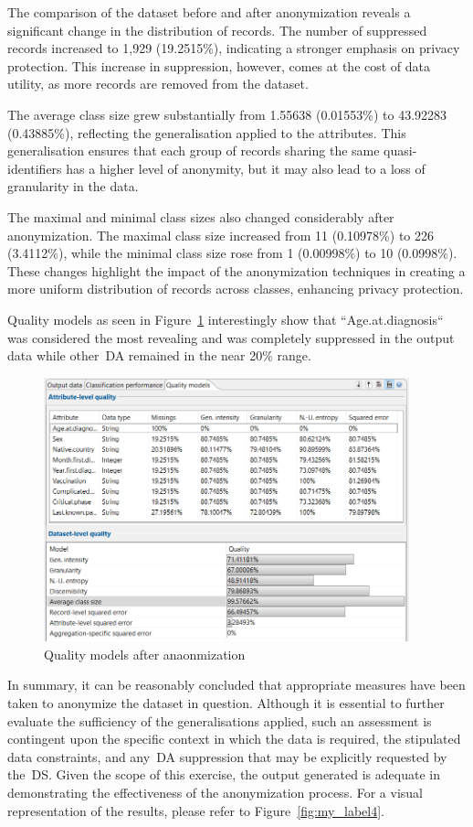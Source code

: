 The comparison of the dataset before and after anonymization reveals a significant change in the distribution of records. The number of suppressed records increased to 1,929 (19.2515\%), indicating a stronger emphasis on privacy protection. This increase in suppression, however, comes at the cost of data utility, as more records are removed from the dataset.

The average class size grew substantially from 1.55638 (0.01553\%) to 43.92283 (0.43885\%), reflecting the generalisation applied to the attributes. This generalisation ensures that each group of records sharing the same quasi-identifiers has a higher level of anonymity, but it may also lead to a loss of granularity in the data.

The maximal and minimal class sizes also changed considerably after anonymization. The maximal class size increased from 11 (0.10978\%) to 226 (3.4112\%), while the minimal class size rose from 1 (0.00998\%) to 10 (0.0998\%). These changes highlight the impact of the anonymization techniques in creating a more uniform distribution of records across classes, enhancing privacy protection.

Quality models as seen in Figure~\ref{fig:my_label5} interestingly show that ``Age.at.diagnosis`` was considered the most revealing and
was completely suppressed in the output data while other~\ac{DA} remained in the near 20\% range.

\begin{figure}[ht]
  \smaller
  \centering
  \includegraphics[width=300pt, keepaspectratio]{assets/quality_models}
  \caption{Quality models after anaonmization}
  \label{fig:my_label5}
\end{figure}


In summary, it can be reasonably concluded that appropriate measures have been taken to anonymize the dataset in question. Although it is
essential
to further evaluate the sufficiency of the generalisations applied, such an assessment is contingent upon the specific context in which the data is required, the stipulated data constraints, and any~\ac{DA} suppression that may be explicitly requested by the~\ac{DS}. Given the scope of this exercise, the output generated is adequate in demonstrating the effectiveness of the anonymization process. For a visual representation of the results, please refer to Figure~\ref{fig:my_label4}.


